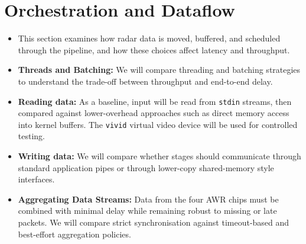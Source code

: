 \section{Orchestration and Dataflow}
\label{sec:orchestration}

\begin{itemize}
    \item This section examines how radar data is moved, buffered, and scheduled through the pipeline, and how these choices affect latency and throughput.

    \item \textbf{Threads and Batching:} We will compare threading and batching strategies to understand the trade-off between throughput and end-to-end delay.

    \item \textbf{Reading data:} As a baseline, input will be read from \texttt{stdin} streams, then compared against lower-overhead approaches such as direct memory access into kernel buffers. The \texttt{vivid} virtual video device will be used for controlled testing.

    \item \textbf{Writing data:} We will compare whether stages should communicate through standard application pipes or through lower-copy shared-memory style interfaces.

    \item \textbf{Aggregating Data Streams:} Data from the four AWR chips must be combined with minimal delay while remaining robust to missing or late packets. We will compare strict synchronisation against timeout-based and best-effort aggregation policies.
\end{itemize}
